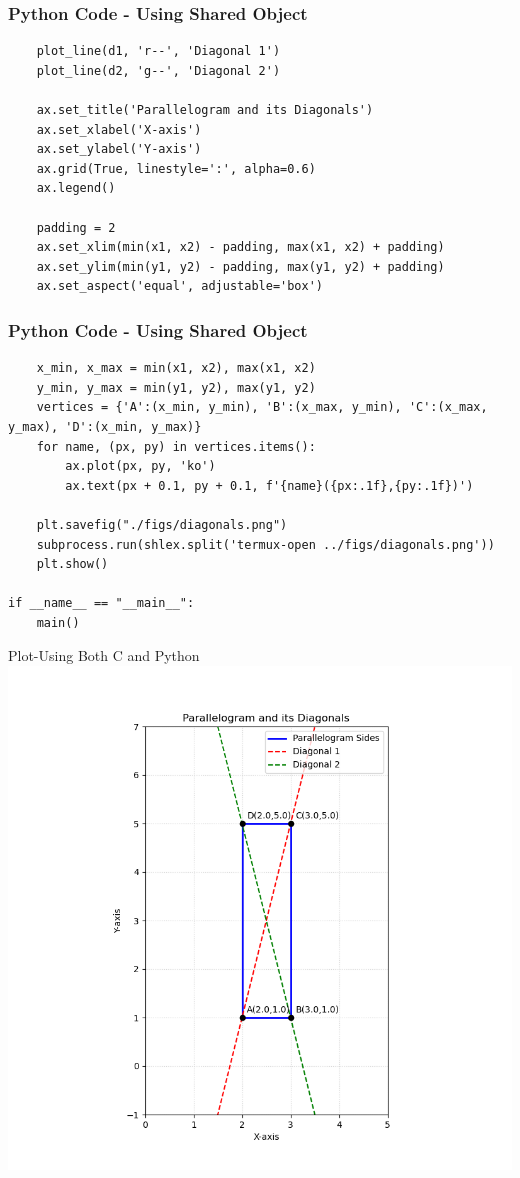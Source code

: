 \documentclass{beamer}
\begin{document}
\begin{frame}[fragile]
    \frametitle{Python Code - Using Shared Object}
    \begin{lstlisting}
    plot_line(d1, 'r--', 'Diagonal 1')
    plot_line(d2, 'g--', 'Diagonal 2')

    ax.set_title('Parallelogram and its Diagonals')
    ax.set_xlabel('X-axis')
    ax.set_ylabel('Y-axis')
    ax.grid(True, linestyle=':', alpha=0.6)
    ax.legend()
    
    padding = 2
    ax.set_xlim(min(x1, x2) - padding, max(x1, x2) + padding)
    ax.set_ylim(min(y1, y2) - padding, max(y1, y2) + padding)
    ax.set_aspect('equal', adjustable='box')
\end{lstlisting}
\end{frame}
\begin{frame}[fragile]
    \frametitle{Python Code - Using Shared Object}
    \begin{lstlisting}
    x_min, x_max = min(x1, x2), max(x1, x2)
    y_min, y_max = min(y1, y2), max(y1, y2)
    vertices = {'A':(x_min, y_min), 'B':(x_max, y_min), 'C':(x_max, y_max), 'D':(x_min, y_max)}
    for name, (px, py) in vertices.items():
        ax.plot(px, py, 'ko')
        ax.text(px + 0.1, py + 0.1, f'{name}({px:.1f},{py:.1f})')

    plt.savefig("./figs/diagonals.png") 
    subprocess.run(shlex.split('termux-open ../figs/diagonals.png'))
    plt.show()

if __name__ == "__main__":
    main()
\end{lstlisting}
\end{frame}

\begin{frame}{Plot-Using Both C and Python}
    \centering
    \includegraphics[width=\columnwidth, height=0.8\textheight, keepaspectratio]{figs/diagonals.png}     
\end{frame}
\end{document}
